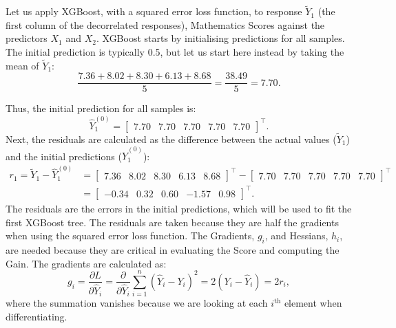 \documentclass[11pt]{report} %
\begin{document}
Let us apply XGBoost, with a squared error loss function, to response $\tilde{Y}_1$ (the first column of the decorrelated responses), Mathematics Scores against the predictors $X_1$ and $X_2$.
XGBoost starts by initialising predictions for all samples. The initial prediction is typically 0.5, but let us start here instead by taking the mean of \( \tilde{Y}_1 \):
\begin{equation}
    \frac{7.36 + 8.02 + 8.30 + 6.13 + 8.68}{5}
= \frac{38.49}{5} = 7.70.
\label{initial_prediction}
\end{equation}

\noindent Thus, the initial prediction for all samples is:
\[
\hat{Y}_1^{(0)} =
\begin{bmatrix}
7.70 & 7.70 & 7.70 & 7.70 & 7.70
\end{bmatrix}^\top.
\]
Next, the residuals are calculated as the difference between the actual values (\( \tilde{Y}_1 \)) and the initial predictions (\( \hat{Y}_1^{(0)} \)):
\begin{equation*}
    \begin{aligned}
        r_1 = \tilde{Y}_1 - \hat{Y}_1^{(0)} &=
\begin{bmatrix}
7.36 & 8.02 & 8.30 & 6.13 & 8.68
\end{bmatrix}^{\top}
-
\begin{bmatrix}
7.70 & 7.70 & 7.70 & 7.70 & 7.70
\end{bmatrix}^{\top} \\
&=
\begin{bmatrix}
-0.34 & 0.32 & 0.60 & -1.57 & 0.98
\end{bmatrix}^{\top}.
    \end{aligned}
\end{equation*}
\noindent The residuals are the errors in the initial predictions, which will be used to fit the first XGBoost tree. The residuals are taken because they are half the gradients when using the squared error loss function. The Gradients, $g_i$, and Hessians, $h_i$, are needed because they are critical in evaluating the Score and computing the Gain. The gradients are calculated as:
\[
g_i = \frac{\partial L}{\partial \hat{Y}_i} = \frac{\partial }{\partial \hat{Y}_i}\sum_{i=1}^{n} (\hat{Y}_i - Y_i)^2 = 2(Y_i - \hat{Y}_i)=2r_i,
\]
where the summation vanishes because we are looking at each $i^{\text{th}}$ element when differentiating.
\end{document}
